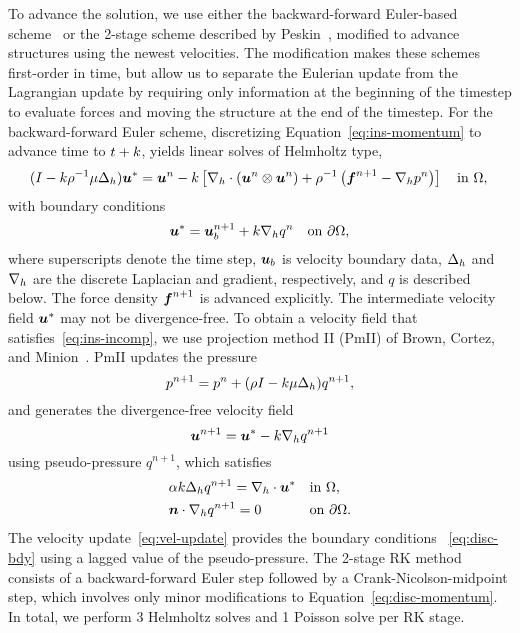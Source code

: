 To advance the solution, we use either the backward-forward Euler-based scheme~%
\cite{Ascher:1997tm} or the 2-stage scheme described by Peskin~\cite{Peskin:2002go},
modified to advance structures using the newest velocities. The modification makes these
schemes first-order in time, but allow us to separate the Eulerian update from the
Lagrangian update by requiring only information at the beginning of the timestep to
evaluate forces and moving the structure at the end of the timestep. For the
backward-forward Euler scheme, discretizing Equation~\eqref{eq:ins-momentum} to advance
time to $t+k$, yields linear solves of Helmholtz type,
\begin{equation}\label{eq:disc-momentum}
    (I - \timestep\rho^{-1}\mu \laplacian_h) \u^\ast = \u^n - \timestep\left[\div[h]\left(\u^n\otimes\u^n\right) + \rho^{-1}\left(\f^{n+1} - \grad[h]p^n\right)\right] \quad\text{in}~\domain, \\
\end{equation}
with boundary conditions
\begin{equation}\label{eq:disc-bdy}
    \u^\ast = \u^{n+1}_b + \timestep \grad[h] q^{n} \quad\text{on}~\partial\domain,
\end{equation}
where superscripts denote the time step, $\boldsymbol{u}_b$ is velocity boundary data, $\Delta_h$
and $\grad[h]$ are the discrete Laplacian and gradient, respectively, and $q$ is
described below. The force density $\boldsymbol{f}^{n+1}$ is advanced explicitly. The intermediate
velocity field $\boldsymbol{u}^\ast$ may not be divergence-free. To obtain a velocity field that
satisfies~\eqref{eq:ins-incomp}, we use projection method II (PmII) of Brown, Cortez, and
Minion~\cite{Brown:2001bq}. PmII updates the pressure
\begin{equation*}
    p^{n+1} = p^n + (\rho I - k\mu\Delta_h)q^{n+1},
\end{equation*}
and generates the divergence-free velocity field
\begin{equation}\label{eq:vel-update}
    \u^{n+1} = \u^\ast - \timestep\grad[h]q^{n+1}
\end{equation}
using pseudo-pressure $q^{n+1}$, which satisfies
\begin{equation}
\begin{alignedat}{2}
    &\alpha k \laplacian_h q^{n+1} = \div[h]\u^\ast &&\quad \text{in}~\domain, \\
    &\n\cdot\grad[h] q^{n+1} = 0                    &&\quad \text{on}~\partial\domain.
\end{alignedat}
\end{equation}
The velocity update~\eqref{eq:vel-update} provides the boundary conditions~%
\eqref{eq:disc-bdy} using a lagged value of the pseudo-pressure. The 2-stage RK method
consists of a backward-forward Euler step followed by a Crank-Nicolson-midpoint step,
which involves only minor modifications to Equation~\eqref{eq:disc-momentum}. In total,
we perform 3 Helmholtz solves and 1 Poisson solve per RK stage.

